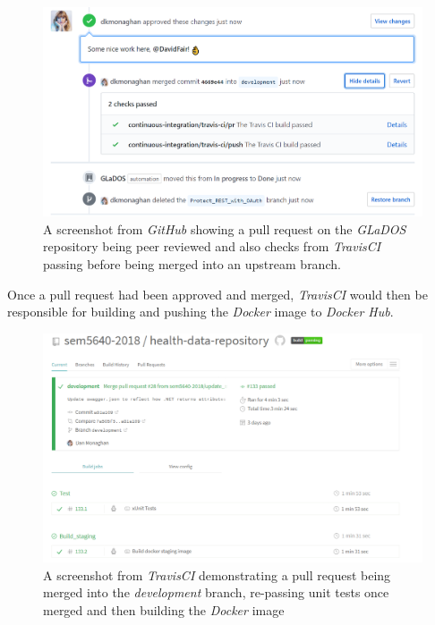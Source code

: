 \begin{figure}[H]
    \centering
    \includegraphics[width=\textwidth]{Images/approve_pr.png}
    \caption{A screenshot from \textit{GitHub} showing a pull request on the \textit{GLaDOS} repository being peer reviewed and also checks from \textit{TravisCI} passing before being merged into an upstream branch.}
\end{figure}

Once a pull request had been approved and merged, \textit{TravisCI} would then be responsible for building and pushing the \textit{Docker} image to \textit{Docker Hub}.

\begin{figure}[H]
    \centering
    \includegraphics[width=\textwidth]{Images/travis_builds_overview.png}
    \caption{A screenshot from \textit{TravisCI} demonstrating a pull request being merged into the \textit{development} branch, re-passing unit tests once merged and then building the \textit{Docker} image}
\end{figure}


